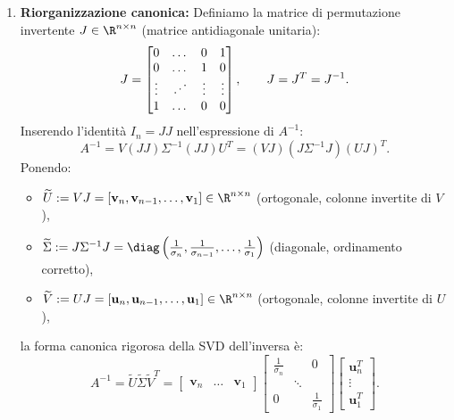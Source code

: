\begin{example}
\begin{enumerate}
    \item \textbf{Riorganizzazione canonica:}
    Definiamo la matrice di permutazione invertente $J \in \R^{n \times n}$ (matrice antidiagonale unitaria):
    \begin{equation}
        J = \begin{bmatrix}
            0 & \dots & 0 & 1 \\
            0 & \dots & 1 & 0 \\
            \vdots & \mathinner{\mkern1mu\raise1pt\vbox{\kern7pt\hbox{.}}\mkern2mu\raise4pt\hbox{.}\mkern2mu\raise7pt\hbox{.}\mkern1mu} & \vdots & \vdots \\
            1 & \dots & 0 & 0
        \end{bmatrix}, \qquad J = J^T = J^{-1}.
    \end{equation}
    Inserendo l'identit\`a $I_n = J J$ nell'espressione di $A^{-1}$:
    \begin{equation}
        A^{-1} = V (J J) \Sigma^{-1} (J J) U^T = (V J) (J \Sigma^{-1} J) (U J)^T.
    \end{equation}
    Ponendo:
    \begin{itemize}
        \item $\widetilde{U} := V J = [\mathbf{v}_n, \mathbf{v}_{n-1}, \dots, \mathbf{v}_1] \in \R^{n \times n}$ (ortogonale, colonne invertite di $V$),
        \item $\widetilde{\Sigma} := J \Sigma^{-1} J = \diag\left(\frac{1}{\sigma_n}, \frac{1}{\sigma_{n-1}}, \dots, \frac{1}{\sigma_1}\right)$ (diagonale, ordinamento corretto),
        \item $\widetilde{V} := U J = [\mathbf{u}_n, \mathbf{u}_{n-1}, \dots, \mathbf{u}_1] \in \R^{n \times n}$ (ortogonale, colonne invertite di $U$),
    \end{itemize}
    la forma canonica rigorosa della SVD dell'inversa \`e:
    \begin{equation}
        A^{-1} = \widetilde{U} \widetilde{\Sigma} \widetilde{V}^T = \begin{bmatrix} \mathbf{v}_n & \dots & \mathbf{v}_1 \end{bmatrix} \begin{bmatrix} \frac{1}{\sigma_n} & & 0 \\ & \ddots & \\ 0 & & \frac{1}{\sigma_1} \end{bmatrix} \begin{bmatrix} \mathbf{u}_n^T \\ \vdots \\ \mathbf{u}_1^T \end{bmatrix}.
    \end{equation}
\end{enumerate}
\end{example}

